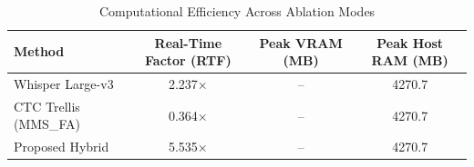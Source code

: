 \begin{table}[t]
\centering
\caption{Computational Efficiency Across Ablation Modes}
\label{tab:computational_performance}
\begin{tabular}{lccc}
\toprule
Method & Real-Time Factor (RTF) & Peak VRAM (MB) & Peak Host RAM (MB) \\
\midrule
Whisper Large-v3 & 2.237\(\times\) & -- & 4270.7 \\
CTC Trellis (MMS\_FA) & 0.364\(\times\) & -- & 4270.7 \\
Proposed Hybrid & 5.535\(\times\) & -- & 4270.7 \\
\bottomrule
\end{tabular}
\end{table}
